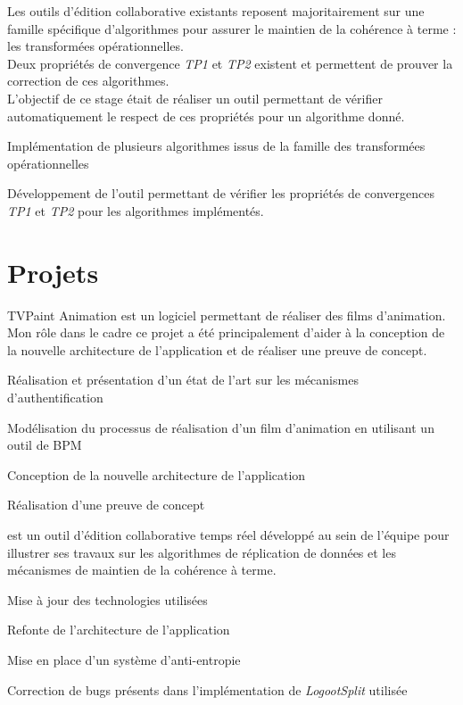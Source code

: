 \documentclass[]{deedy-resume-openfont}
\begin{document}
\hfill\begin{minipage}{\dimexpr\textwidth-0.5cm}
Les outils d'édition collaborative existants reposent majoritairement sur une famille spécifique d'algorithmes
pour assurer le maintien de la cohérence à terme : les transformées opérationnelles.
\\
Deux propriétés de convergence \emph{TP1} et \emph{TP2} existent et permettent de prouver la correction de ces algorithmes.
\\
L'objectif de ce stage était de réaliser un outil permettant de vérifier automatiquement le respect de ces propriétés pour un algorithme donné.
\begin{tightemize}
\item Implémentation de plusieurs algorithmes issus de la famille des transformées opérationnelles
\item Développement de l'outil permettant de vérifier les propriétés de convergences \emph{TP1} et \emph{TP2} pour les algorithmes implémentés.
\end{tightemize}
\sectionsep\xdef\tpd{\the\prevdepth}
\end{minipage}

\section{Projets}

TVPaint Animation est un logiciel permettant de réaliser des films d'animation.
\\
Mon rôle dans le cadre ce projet a été principalement d'aider à la conception de la nouvelle architecture de l'application et de réaliser une preuve de concept.
\begin{tightemize}
\item Réalisation et présentation d'un état de l'art sur les mécanismes d'authentification
\item Modélisation du processus de réalisation d'un film d'animation en utilisant un outil de BPM
\item Conception de la nouvelle architecture de l'application
\item Réalisation d'une preuve de concept
\end{tightemize}
\sectionsep

\href{https://www.coedit.re}{} est un outil d'édition collaborative temps réel développé au sein de l'équipe
pour illustrer ses travaux sur les algorithmes de réplication de données et les mécanismes de maintien de la cohérence à terme.
\begin{tightemize}
\item Mise à jour des technologies utilisées
\item Refonte de l'architecture de l'application
\item Mise en place d'un système d'anti-entropie
\item Correction de bugs présents dans l'implémentation de \emph{LogootSplit} utilisée
\end{tightemize}
\sectionsep
\end{document}
